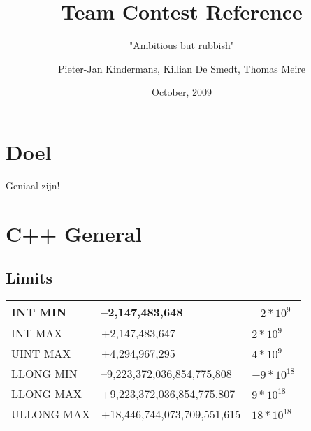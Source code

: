 \documentclass[a4paper,10pt,oneside]{report}
\title {{\huge Team Contest Reference}}
\author {
	{\LARGE "Ambitious but rubbish"} \and
	Pieter-Jan Kindermans, Killian De Smedt, Thomas Meire
}
\date {October, 2009}
\begin{document}
\maketitle

\tableofcontents

\chapter{Doel}
Geniaal zijn!
\chapter{C++ General}
\section{Limits}
\begin{center}
\begin{tabular}{|l l l|}
\hline
INT MIN 	& –2,147,483,648 	& $-2*10^{9}$\\	
\hline
INT MAX 	& +2,147,483,647 	& $2*10^{9}$\\
\hline
UINT MAX 	& +4,294,967,295  & $4*10^{9}$\\
\hline
LLONG MIN 	& –9,223,372,036,854,775,808 & $-9*10^{18}$\\
\hline
LLONG MAX 	& +9,223,372,036,854,775,807 & $9*10^{18}$\\
\hline
ULLONG MAX 	&+18,446,744,073,709,551,615 & $18*10^{18}$\\	
\hline
\end{tabular} 
\end{center}
\end{document}
